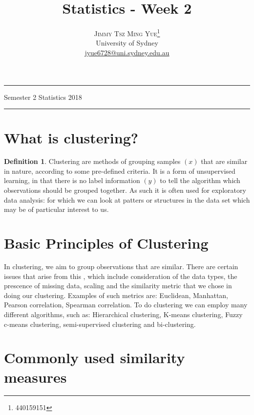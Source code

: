 \documentclass[twoside]{article}
\title{\vspace{-15mm}\fontsize{24pt}{10pt}\selectfont\textbf{Statistics - Week 2}} %
\author{
\large
\textsc{Jimmy Tsz Ming Yue}\thanks{440159151}\\[2mm] %
\normalsize University of Sydney \\ %
\normalsize \href{mailto:jyue6728@uni.sydney.edu.au}{jyue6728@uni.sydney.edu.au} %
\vspace{-5mm}
}
\date{}
\theoremstyle{definition}
\theoremstyle{definition}
\newtheorem*{proof1}{Definition}
\newenvironment{ddef}{\begin{dBox}\begin{proof1}}{\hfill{\scriptsize}\end{proof1}\end{dBox}}
\begin{document}

\maketitle %

\thispagestyle{fancy} %
\hrule \smallskip

\noindent Semester 2 \quad Statistics \hspace{11.5
cm} 2018
\smallskip
\hrule
\smallskip
\tableofcontents
\section{What is clustering?}

\begin{ddef}
	Clustering are methods of grouping samples $(x)$ that are similar in nature, according to some pre-defined criteria. It is a form of unsupervised learning, in that there is no label information $(y)$ to tell the algorithm which observations should be grouped together. As such it is often used for exploratory data analysis: for which we can look at patters or structures in the data set which may be of particular interest to us. 
\end{ddef}
\section{Basic Principles of Clustering}

In clustering, we aim to group observations that are similar. There are certain issues that arise from this , which include consideration of the data types, the prescence of missing data, scaling and the similarity metric that we chose in doing our clustering. Examples of such metrics are: Euclidean, Manhattan, Pearson correlation, Spearman correlation. To do clustering we can employ many different algorithms, such as: Hierarchical clustering, K-means clustering, Fuzzy c-means clustering, semi-supervised clustering and bi-clustering.

\section{Commonly used similarity measures}
\end{document}
